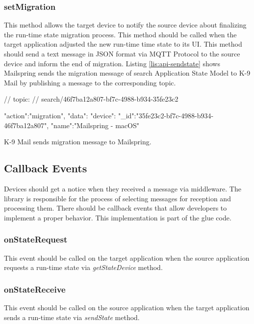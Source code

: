 \subsubsection{setMigration}
This method allows the target device to notify the source device about finalizing the run-time state migration process. This method should be called when the target application adjusted the new run-time time state to its UI. This method should send a text message in JSON format via MQTT Protocol to the source device and inform the end of migration. Listing \ref{lis:api-sendstate} shows Mailspring sends the migration message of search Application State Model to K-9 Mail by publishing a message to the corresponding topic.

\FloatBarrier
\begin{code}
\begin{js2}
// topic:
// search/46f7ba12a807-bf7c-4988-b934-35fe23c2
\end{js2}

\begin{json}
{
   "action":"migration",
   "data":{
      "device":{
         "_id":"35fe23c2-bf7c-4988-b934-46f7ba12a807",
         "name":"Mailspring - macOS"
      }
   }
}
\end{json}
\caption{K-9 Mail sends migration message to Mailspring.}
\label{lis:api-setmigration}
\end{code}
\FloatBarrier

\subsection{Callback Events}
Devices should get a notice when they received a message via middleware. The library is responsible for the process of selecting messages for reception and processing them. There should be callback events that allow developers to implement a proper behavior. This implementation is part of the glue code.

\subsubsection{onStateRequest}
This event should be called on the target application when the source application requests a run-time state via \textit{getStateDevice} method.

\subsubsection{onStateReceive}
This event should be called on the source application when the target application sends a run-time state via \textit{sendState} method.

